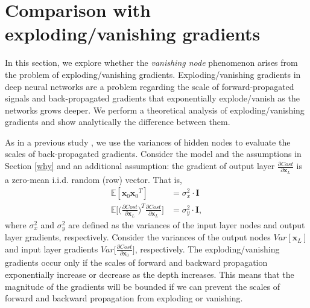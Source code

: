 \chapter{Comparison with exploding/vanishing gradients} \label{compare}

In this section, we explore whether the \textit{vanishing node} phenomenon arises from the problem of  exploding/vanishing gradients. Exploding/vanishing gradients in deep neural networks are a problem regarding the scale of forward-propagated signals and back-propagated gradients that exponentially explode/vanish as the networks grows deeper. We perform a theoretical analysis of exploding/vanishing gradients and show analytically the difference between them.



As in a previous study \cite{xavier}, we use the variances of hidden nodes to evaluate the scales of back-propagated gradients. Consider the model and the assumptions in Section \ref{why} and an additional assumption: the gradient of output layer $\frac{\partial Cost}{\partial \mathbf{x}_L}$ is a zero-mean i.i.d. random (row) vector.
That is,
\begin{equation}
    \begin{aligned}
    \mathbb{E}[\mathbf{x}_0{\mathbf{x}_0}^T] &= \sigma_x^2\cdot\mathbf{I} \\
    \mathbb{E}\Big[\Big(\frac{\partial Cost}{\partial \mathbf{x}_L}\Big)^T\frac{\partial Cost}{\partial \mathbf{x}_L}\Big] 
    &= \sigma_y^2\cdot\mathbf{I},
    \end{aligned}
\end{equation}
where $\sigma_x^2$ and $\sigma_y^2$ are defined as the variances of the input layer nodes and output layer gradients, respectively.
Consider %
the variances of the output nodes $Var[\mathbf{x}_L]$ and input layer gradients $Var\Big[\frac{\partial Cost}{\partial \mathbf{x}_0}\Big]$, respectively.
The exploding/vanishing gradients  occur only if the scales of forward and backward propagation exponentially increase or decrease as the depth increases.
This means that the magnitude of the gradients will be bounded if we can prevent the scales of forward and backward propagation from exploding or vanishing. 

